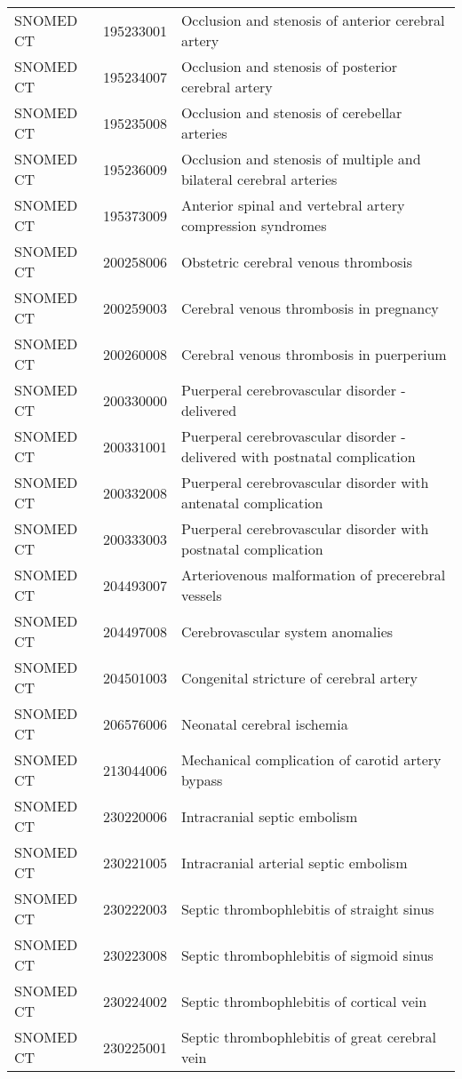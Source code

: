 \begin{longtable}{p{}p{}p{}}
  SNOMED CT & 195233001 & Occlusion and stenosis of anterior cerebral artery \\ 
  SNOMED CT & 195234007 & Occlusion and stenosis of posterior cerebral artery \\ 
  SNOMED CT & 195235008 & Occlusion and stenosis of cerebellar arteries \\ 
  SNOMED CT & 195236009 & Occlusion and stenosis of multiple and bilateral cerebral arteries \\ 
  SNOMED CT & 195373009 & Anterior spinal and vertebral artery compression syndromes \\ 
  SNOMED CT & 200258006 & Obstetric cerebral venous thrombosis \\ 
  SNOMED CT & 200259003 & Cerebral venous thrombosis in pregnancy \\ 
  SNOMED CT & 200260008 & Cerebral venous thrombosis in puerperium \\ 
  SNOMED CT & 200330000 & Puerperal cerebrovascular disorder - delivered \\ 
  SNOMED CT & 200331001 & Puerperal cerebrovascular disorder - delivered with postnatal complication \\ 
  SNOMED CT & 200332008 & Puerperal cerebrovascular disorder with antenatal complication \\ 
  SNOMED CT & 200333003 & Puerperal cerebrovascular disorder with postnatal complication \\ 
  SNOMED CT & 204493007 & Arteriovenous malformation of precerebral vessels \\ 
  SNOMED CT & 204497008 & Cerebrovascular system anomalies \\ 
  SNOMED CT & 204501003 & Congenital stricture of cerebral artery \\ 
  SNOMED CT & 206576006 & Neonatal cerebral ischemia \\ 
  SNOMED CT & 213044006 & Mechanical complication of carotid artery bypass \\ 
  SNOMED CT & 230220006 & Intracranial septic embolism \\ 
  SNOMED CT & 230221005 & Intracranial arterial septic embolism \\ 
  SNOMED CT & 230222003 & Septic thrombophlebitis of straight sinus \\ 
  SNOMED CT & 230223008 & Septic thrombophlebitis of sigmoid sinus \\ 
  SNOMED CT & 230224002 & Septic thrombophlebitis of cortical vein \\ 
  SNOMED CT & 230225001 & Septic thrombophlebitis of great cerebral vein \\ 

\end{longtable}
